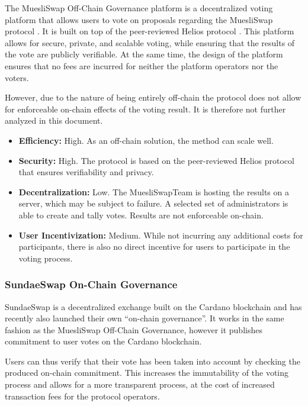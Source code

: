 \documentclass[11pt]{article}
\begin{document}
The MuesliSwap Off-Chain Governance platform is a decentralized voting platform that allows users to vote on proposals regarding the MuesliSwap protocol \cite{muesliswap-offchain}.
It is built on top of the peer-reviewed Helios protocol \cite{DBLP:conf/uss/Adida08}.
This platform allows for secure, private, and scalable voting, while ensuring that the results of the vote are publicly verifiable.
At the same time, the design of the platform ensures that no fees are incurred for neither the platform operators nor the voters.

However, due to the nature of being entirely off-chain the protocol does not allow for enforceable on-chain effects of the voting result.
It is therefore not further analyzed in this document.

\begin{itemize}
    \item \textbf{Efficiency:} High. As an off-chain solution, the method can scale well.
    \item \textbf{Security:} High. The protocol is based on the peer-reviewed Helios protocol that ensures verifiability and privacy.
    \item \textbf{Decentralization:} Low. The MuesliSwapTeam is hosting the results on a server, which may be subject to failure. A selected set of administrators is able to create and tally votes. Results are not enforceable on-chain.
    \item \textbf{User Incentivization:} Medium. While not incurring any additional costs for participants, there is also no direct incentive for users to participate in the voting process.
\end{itemize}

\subsubsection{SundaeSwap On-Chain Governance}

SundaeSwap is a decentralized exchange built on the Cardano blockchain
and has recently also launched their own ``on-chain governance''\cite{Labs-2023}.
It works in the same fashion as the MuesliSwap Off-Chain Governance,
however it publishes commitment to user votes on the Cardano blockchain.

Users can thus verify that their vote has been taken into account by checking the produced on-chain commitment.
This increases the immutability of the voting process and allows for a more transparent process,
at the cost of increased transaction fees for the protocol operators.
\end{document}
